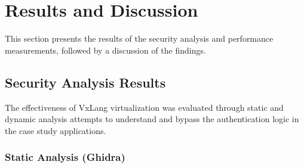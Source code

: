 \section{Results and Discussion} \label{sec:results_discussion}
This section presents the results of the security analysis and performance measurements, followed by a discussion of the findings.

\subsection{Security Analysis Results}
The effectiveness of VxLang virtualization was evaluated through static and dynamic analysis attempts to understand and bypass the authentication logic in the case study applications.

\subsubsection{Static Analysis (Ghidra)}
